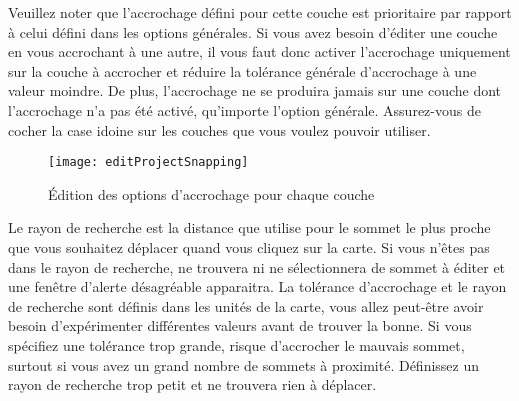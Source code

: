 
Veuillez noter que l'accrochage défini pour cette couche est prioritaire par rapport à celui défini dans les options générales. Si vous avez besoin d'éditer une couche en vous accrochant à une autre, il vous faut donc activer l'accrochage uniquement sur la couche à accrocher et réduire la tolérance générale d'accrochage à une valeur moindre. De plus, l'accrochage ne se produira jamais sur une couche dont l'accrochage n'a pas été activé, qu'importe l'option générale. Assurez-vous de cocher la case idoine sur les couches que vous voulez pouvoir utiliser.

\begin{figure}[H]
  \begin{center}
  \texttt{[image: editProjectSnapping]}
  \caption{Édition des options d'accrochage pour chaque couche \nixcaption}\label{fig:snappingoptions}
\end{center}
\end{figure}


Le rayon de recherche est la distance que \qg utilise pour  le sommet le plus proche que vous souhaitez déplacer quand vous cliquez sur la carte. Si vous n'êtes pas dans le rayon de recherche, \qg ne trouvera ni ne sélectionnera de sommet à éditer et une fenêtre d'alerte désagréable apparaitra. La tolérance d'accrochage et le rayon de recherche sont définis dans les unités de la carte, vous allez peut-être avoir besoin d'expérimenter différentes valeurs avant de trouver la bonne. Si vous spécifiez une tolérance trop grande, \qg risque d'accrocher le mauvais sommet, surtout si vous avez un grand nombre de sommets à proximité. Définissez un rayon de recherche trop petit et \qg ne trouvera rien à déplacer.

